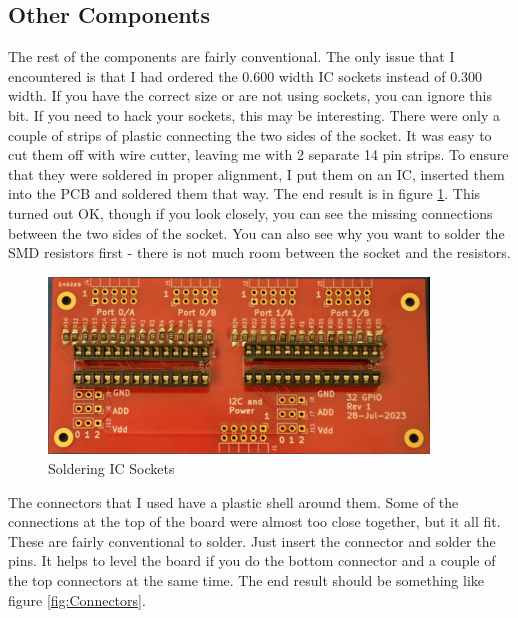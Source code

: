 \documentclass[10pt, openany]{book}
\begin{document}
\clearpage
\subsection{Other Components}
The rest of the components are fairly conventional.  The only issue that I encountered is that I had ordered the 0.600 width IC sockets instead of 0.300 width.  If you have the correct size or are not using sockets, you can ignore this bit.  If you need to hack your sockets, this may be interesting.  There were only a couple of strips of plastic connecting the two sides of the socket.  It was easy to cut them off with wire cutter, leaving me with 2 separate 14 pin strips.  To ensure that they were soldered in proper alignment, I put them on an IC, inserted them into the PCB and soldered them that way.  The end result is in figure \ref{fig:Sockets}.  This turned out OK, though if you look closely, you can see the missing connections between the two sides of the socket.  You can also see why you want to solder the SMD resistors first - there is not much room between the socket and the resistors.

\begin{figure}[ht!]
  \centering
  \includegraphics[width=0.9\textwidth]{../Pictures/Sockets.jpg}
  \caption{Soldering IC Sockets}
  \label{fig:Sockets}
\end{figure}

The connectors that I used have a plastic shell around them.  Some of the connections at the top of the board were almost too close together, but it all fit.  These are fairly conventional to solder.  Just insert the connector and solder the pins.  It helps to level the board if you do the bottom connector and a couple of the top connectors at the same time.  The end result should be something like figure \ref{fig:Connectors}.
\end{document}
